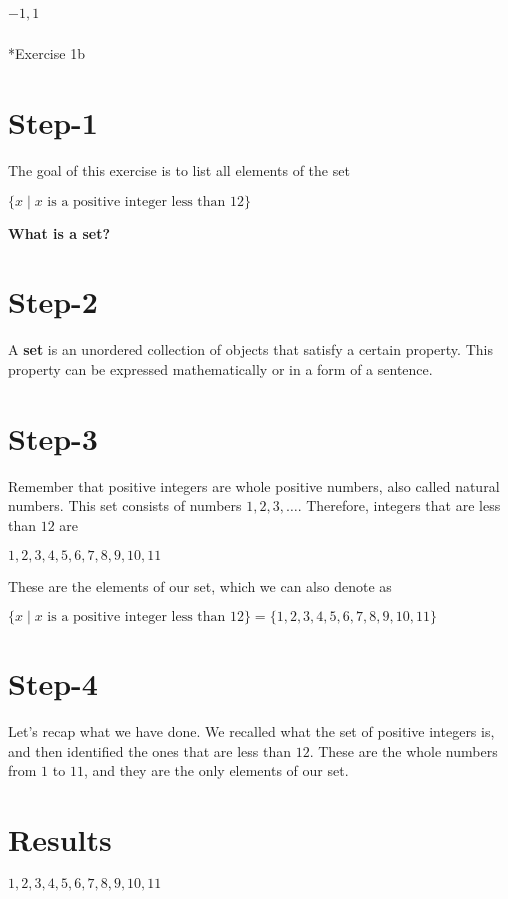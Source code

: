 \documentclass[
  letterpaper,
  DIV=11,
  numbers=noendperiod]{scrreprt}
\makeatletter
\let\oldsubparagraph\subparagraph
\renewcommand{\subparagraph}{
    \@ifstar
      \xxxSubParagraphStar
      \xxxSubParagraphNoStar
  }
\newcommand{\xxxSubParagraphStar}[1]{\oldsubparagraph*{#1}\mbox{}}
\newcommand{\xxxSubParagraphNoStar}[1]{\oldsubparagraph{#1}\mbox{}}
\makeatother
\begin{document}
\begin{tcolorbox}[enhanced jigsaw, colframe=quarto-callout-note-color-frame, toprule=.15mm, bottomrule=.15mm, rightrule=.15mm, colback=white, breakable, arc=.35mm, opacityback=0, left=2mm, leftrule=.75mm]
\(−1,1\)

\subparagraph*{Exercise 1b}\label{exercise-1b}

\section{Step-1}

The goal of this exercise is to list all elements of the set

\(\{x∣ x \text{ is a positive integer less than } 12\}\)

\textbf{What is a set?}

\section{Step-2}

A \textbf{set} is an unordered collection of objects that satisfy a
certain property. This property can be expressed mathematically or in a
form of a sentence.

\section{Step-3}

Remember that positive integers are whole positive numbers, also called
natural numbers. This set consists of numbers \(1,2,3,….\) Therefore,
integers that are less than \(12\) are

\(1,2,3,4,5,6,7,8,9,10,11\)

These are the elements of our set, which we can also denote as

\(\{x∣ x \text{ is a positive integer less than } 12\} = \{1,2,3,4,5,6,7,8,9,10,11\}\)

\section{Step-4}

Let's recap what we have done. We recalled what the set of positive
integers is, and then identified the ones that are less than \(12\).
These are the whole numbers from \(1\) to \(11\), and they are the only
elements of our set.

\section{Results}

\(1,2,3,4,5,6,7,8,9,10,11\)


\end{tcolorbox}
\end{document}
